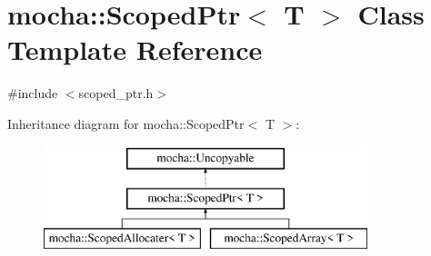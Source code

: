\hypertarget{classmocha_1_1_scoped_ptr}{
\section{mocha::ScopedPtr$<$ T $>$ Class Template Reference}
\label{classmocha_1_1_scoped_ptr}
}


{\ttfamily \#include $<$scoped\_\-ptr.h$>$}

Inheritance diagram for mocha::ScopedPtr$<$ T $>$:\begin{figure}[H]
\begin{center}
\leavevmode
\includegraphics[height=3.000000cm]{classmocha_1_1_scoped_ptr}
\end{center}
\end{figure}
